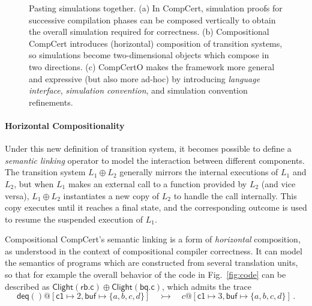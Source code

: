 \documentclass[acmsmall,screen,review,anonymous]{acmart}
\newcommand{\kw}[1]{\ensuremath{ \mathsf{#1} }}
\begin{document}
\begin{figure}
  \caption{%
    Pasting simulations together.
    (a) In CompCert,
    simulation proofs for successive compilation phases
    can be composed vertically to obtain the overall simulation
    required for correctness.
    (b) Compositional CompCert
    introduces (horizontal) composition of transition systems,
    so simulations become two-dimensional objects
    which compose in two directions.
    (c)
    CompCertO makes the framework more general and expressive
    (but also more ad-hoc)
    by introducing \emph{language interface},
    \emph{simulation convention}, and simulation convention refinements.}
  \label{fig:pasting}
\end{figure}

\paragraph{Horizontal Compositionality} %

Under this new definition of transition system,
it becomes possible to define a \emph{semantic linking} operator
to model the interaction between different components.
The transition system $L_1 \oplus L_2$
generally mirrors the internal executions of $L_1$ and $L_2$,
but when $L_1$ makes an external call
to a function provided by $L_2$ (and vice versa),
$L_1 \oplus L_2$ instantiates a new copy of $L_2$ to handle the call internally.
This copy executes until it reaches a final state,
and the corresponding outcome is used to resume
the suspended execution of $L_1$.

Compositional CompCert's semantic linking
is a form of \emph{horizontal} composition,
as understood in the context of compositional compiler correctness.
It can model the semantics of programs
which are constructed from several translation units,
so that for example the overall behavior of the code in Fig.~\ref{fig:code}
can be described as
$
  \kw{Clight}(\kw{rb.c}) \oplus \kw{Clight}(\kw{bq.c})
$,
which admits the trace
\[
  \kw{deq}()@[\kw{c1} \mapsto 2, \kw{buf} \mapsto \{a,b,c,d\}]
  \quad\rightarrowtail\quad
  c@[\kw{c1} \mapsto 3, \kw{buf} \mapsto \{a,b,c,d\}]
  \,.
\]
\end{document}
